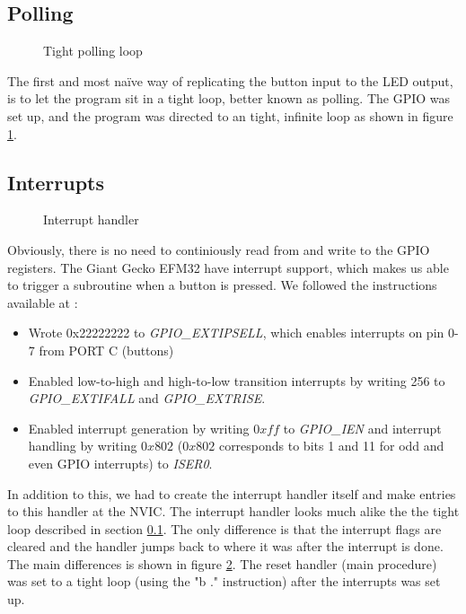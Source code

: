 	\subsection{Polling}
	\label{subsection:polling}
	\begin{figure}[t]
		
		\caption{Tight polling loop}
		\label{code:polling_loop}
	\end{figure}
	The first and most naïve way of replicating the button input to the LED output, is to let the program sit in a tight loop, better known as polling. The GPIO was set up, and the program was directed to an tight, infinite loop as shown in figure \ref{code:polling_loop}.

	\subsection{Interrupts}
	\label{subsection:interrupts}
	\begin{figure}[t]
		
		\caption{Interrupt handler}
		\label{code:interrupt_handler}
	\end{figure}
	Obviously, there is no need to continiously read from and write to the GPIO registers. The Giant Gecko EFM32 have interrupt support, which makes us able to trigger a subroutine when a button is pressed. We followed the instructions available at \cite[p. 24]{compendium}:
	\begin{itemize}
		\item Wrote 0x22222222 to \emph{GPIO\_EXTIPSELL}, which enables interrupts on pin 0-7 from PORT C (buttons) \cite[p. 770]{reference_manual}
		\item Enabled low-to-high and high-to-low transition interrupts by writing 256 to \emph{GPIO\_EXTIFALL} and \emph{GPIO\_EXTRISE}.
		\item Enabled interrupt generation by writing $0xff$ to \emph{GPIO\_IEN} and interrupt handling by writing $0x802$ ($0x802$ corresponds to bits 1 and 11 for odd and even GPIO interrupts) to \emph{ISER0}.
	\end{itemize}
	
	


In addition to this, we had to create the interrupt handler itself and make entries to this handler at the NVIC. The interrupt handler looks much alike the the tight loop described in section \ref{subsection:polling}. The only difference is that the interrupt flags are cleared and the handler jumps back to where it was after the interrupt is done. The main differences is shown in figure \ref{code:interrupt_handler}. The reset handler (main procedure) was set to a tight loop (using the "b ." instruction) after the interrupts was set up.


